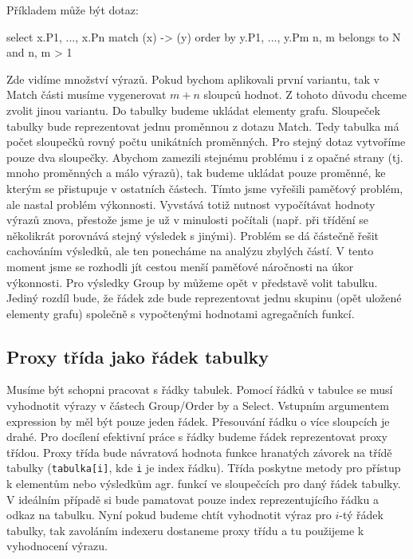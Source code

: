 \clearpage

Příkladem může být dotaz: 
\begin{code}
select x.P1, ..., x.Pn match (x) -> (y) order by y.P1, ..., y.Pm  
n, m belongs to N and n, m > 1
\end{code}

Zde vidíme množství výrazů.
Pokud bychom aplikovali první variantu, tak v Match části musíme vygenerovat $m + n$ sloupců hodnot.
Z tohoto důvodu chceme zvolit jinou variantu.
Do tabulky budeme ukládat elementy grafu.
Sloupeček tabulky bude reprezentovat jednu proměnnou z dotazu Match.
Tedy tabulka má počet sloupečků rovný počtu unikátních proměnných. 
Pro stejný dotaz vytvoříme pouze dva sloupečky.
Abychom zamezili stejnému problému i z opačné strany (tj. mnoho proměnných a málo výrazů), tak budeme ukládat pouze proměnné, ke kterým se přistupuje v ostatních částech.
Tímto jsme vyřešili paměťový problém, ale nastal problém výkonnosti.
Vyvstává totiž nutnost vypočítávat hodnoty výrazů znova, přestože jsme je už v minulosti počítali (např. při třídění se několikrát porovnává stejný výsledek s jinými).
Problém se dá částečně řešit cachováním výsledků, ale ten ponecháme na analýzu zbylých částí.
V tento moment jsme se rozhodli jít cestou menší paměťové náročnosti na úkor výkonnosti.
Pro výsledky Group by můžeme opět v představě volit tabulku.
Jediný rozdíl bude, že řádek zde bude reprezentovat jednu skupinu (opět uložené elementy grafu) společně s vypočtenými hodnotami agregačních funkcí.

\subsection{Proxy třída jako řádek tabulky}

Musíme být schopni pracovat s řádky tabulek.
Pomocí řádků v tabulce se musí vyhodnotit výrazy v částech Group/Order by a Select.
Vstupním argumentem expression by měl být pouze jeden řádek.
Přesouvání řádku o více sloupcích je drahé.
Pro docílení efektivní práce s řádky budeme řádek reprezentovat proxy třídou.
Proxy třída bude návratová hodnota funkce hranatých závorek na třídě tabulky (\texttt{tabulka[i]}, kde \texttt{i} je index řádku).
Třída poskytne metody pro přístup k elementům nebo výsledkům agr. funkcí ve sloupečcích pro daný řádek tabulky.
V ideálním případě si bude pamatovat pouze index reprezentujícího řádku a odkaz na tabulku.
Nyní pokud budeme chtít vyhodnotit výraz pro $i$-tý řádek tabulky, tak zavoláním indexeru dostaneme proxy třídu a tu použijeme k vyhodnocení výrazu.

